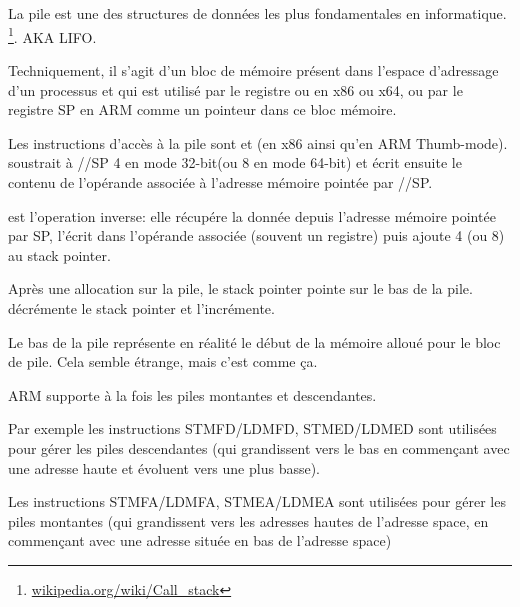 \section{\Stack}
\label{sec:stack}
\myindex{\Stack}

La pile est une des structures de données les plus fondamentales en informatique.
\footnote{\href{http://go.yurichev.com/17119}{wikipedia.org/wiki/Call\_stack}}.
\ac{AKA} \ac{LIFO}.

Techniquement, il s'agit d'un bloc de mémoire présent dans l'espace d'adressage d'un processus et qui est utilisé par le registre \ESP ou \RSP en x86 ou x64, ou par le registre \ac{SP} en ARM comme un pointeur dans ce bloc mémoire. 

Les instructions d'accès à la pile sont \PUSH et \POP (en x86 ainsi qu'en ARM Thumb-mode).
\PUSH soustrait à \ESP/\RSP/\ac{SP} 4 en mode 32-bit(ou 8 en mode 64-bit) et écrit ensuite le contenu de l'opérande associée à l'adresse mémoire pointée par \ESP/\RSP/\ac{SP}.

\POP est l'operation inverse: elle récupére la donnée depuis l'adresse mémoire pointée par \ac{SP}, l'écrit dans l'opérande associée (souvent un registre) puis ajoute 4 (ou 8) au \gls{stack pointer}.

Après une allocation sur la pile, le \gls{stack pointer} pointe sur le bas de la pile.
\PUSH décrémente le \gls{stack pointer} et \POP l'incrémente.

Le bas de la pile représente en réalité le début de la mémoire alloué pour le bloc de pile. Cela semble étrange, mais c'est comme ça.

ARM supporte à la fois les piles montantes et descendantes.


Par exemple les instructions \ac{STMFD}/\ac{LDMFD}, \ac{STMED}/\ac{LDMED} sont utilisées pour gérer les piles descendantes (qui grandissent vers le bas en commençant avec une adresse haute et évoluent vers une plus basse).

Les instructions \ac{STMFA}/\ac{LDMFA}, \ac{STMEA}/\ac{LDMEA} sont utilisées pour gérer les piles montantes (qui grandissent vers les adresses hautes de l'adresse space, en commençant avec une adresse située en bas de l'adresse space)

